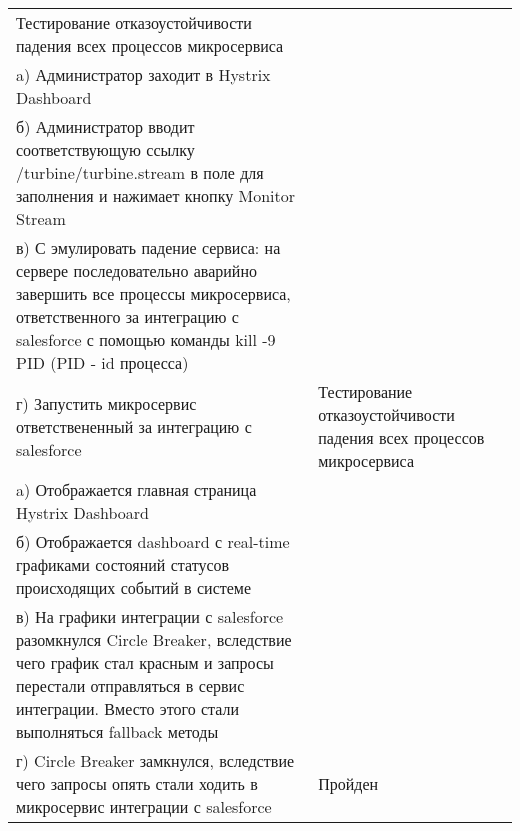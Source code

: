 \begin{longtable}[l]{| >{\raggedright}m{}
                  | >{\raggedright}m{}
                  | >{\raggedright\arraybackslash}m{}|}
    \hline


    Тестирование отказоустойчивости падения всех процессов микросервиса \\
    a) Администратор заходит в Hystrix Dashboard \\
    б) Администратор вводит соответствующую ссылку /turbine/turbine.stream в поле для заполнения и нажимает кнопку Monitor Stream \\
    в) С эмулировать падение сервиса: на сервере последовательно аварийно завершить все процессы микросервиса, ответственного за интеграцию с salesforce с помощью команды kill -9 PID (PID - id процесса) \\
    г) Запустить микросервис ответствененный за интеграцию с salesforce
    & 
    Тестирование отказоустойчивости падения всех процессов микросервиса \\
    a) Отображается главная страница Hystrix Dashboard \\
    б) Отображается dashboard с real-time графиками состояний статусов происходящих событий в системе \\
    в) На графики интеграции с salesforce разомкнулся Circle Breaker, вследствие чего график стал красным и запросы перестали отправляться в сервис интеграции. Вместо этого стали выполняться fallback методы \\
    г) Circle Breaker замкнулся, вследствие чего запросы опять стали ходить в микросервис интеграции с salesforce
    & 
    Пройден \\ \hline

\end{longtable}

